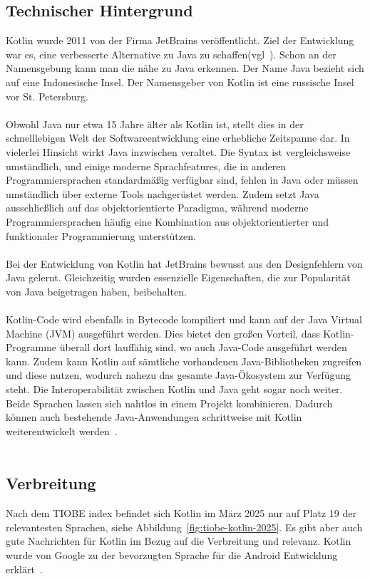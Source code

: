 \documentclass[11pt]{article}
\begin{document}
    \subsection{Technischer Hintergrund}
    Kotlin wurde 2011 von der Firma JetBrains veröffentlicht.
    Ziel der Entwicklung war es, eine verbesserte Alternative zu Java zu schaffen(vgl~\cite[19]{kotlin-handbuch}).
    Schon an der Namensgebung kann man die nähe zu Java erkennen.
    Der Name Java bezieht sich auf eine Indonesische Insel.
    Der Namensgeber von Kotlin ist eine russische Insel vor St. Petersburg.\\
    \\
    Obwohl Java nur etwa 15 Jahre älter als Kotlin ist, stellt dies in der schnelllebigen Welt der Softwareentwicklung eine erhebliche Zeitspanne dar.
    In vielerlei Hinsicht wirkt Java inzwischen veraltet.
    Die Syntax ist vergleichsweise umständlich, und einige moderne Sprachfeatures, die in anderen Programmiersprachen standardmäßig verfügbar sind, fehlen in Java oder
    müssen umständlich über externe Tools nachgerüstet werden.
    Zudem setzt Java ausschließlich auf das objektorientierte Paradigma,
    während moderne Programmiersprachen häufig eine Kombination aus objektorientierter und funktionaler Programmierung unterstützen.\\
    \\
    Bei der Entwicklung von Kotlin hat JetBrains bewusst aus den Designfehlern von Java gelernt.
    Gleichzeitig wurden essenzielle Eigenschaften, die zur Popularität von Java beigetragen haben, beibehalten.\\
    \\
    Kotlin-Code wird ebenfalls in Bytecode kompiliert und kann auf der Java Virtual Machine (JVM) ausgeführt werden.
    Dies bietet den großen Vorteil, dass Kotlin-Programme überall dort lauffähig sind, wo auch Java-Code ausgeführt werden kann.
    Zudem kann Kotlin auf sämtliche vorhandenen Java-Bibliotheken zugreifen und diese nutzen, wodurch nahezu das gesamte Java-Ökosystem zur Verfügung steht.
    Die Interoperabilität zwischen Kotlin und Java geht sogar noch weiter.
    Beide Sprachen lassen sich nahtlos in einem Projekt kombinieren.
    Dadurch können auch bestehende Java-Anwendungen schrittweise mit Kotlin weiterentwickelt werden~\cite[19-20]{kotlin-handbuch}.\\
    \\
    \subsection{Verbreitung}
    Nach dem TIOBE index befindet sich Kotlin im März 2025 nur auf Platz 19 der relevantesten Sprachen, siehe Abbildung~\ref{fig:tiobe-kotlin-2025}.
    Es gibt aber auch gute Nachrichten für Kotlin im Bezug auf die Verbreitung und relevanz.
    Kotlin wurde von Google zu der bevorzugten Sprache für die Android Entwicklung erklärt~\cite{tn3-google}.\\
    \\
\end{document}

